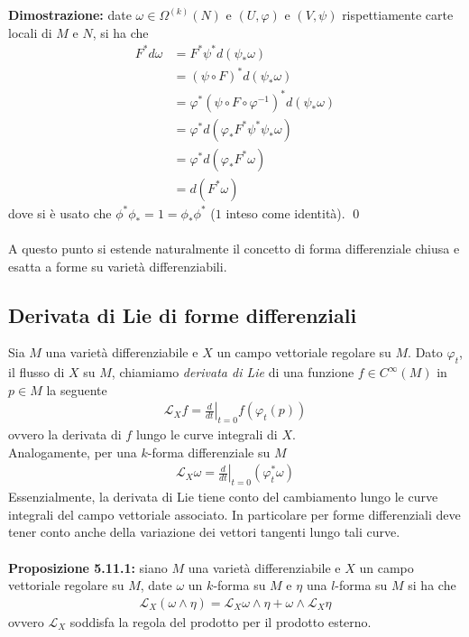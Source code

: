 \documentclass{article}
\begin{document}
\textbf{Dimostrazione:} date $\omega \in \Omega^{(k)}(N)$ e $(U, \varphi)$ e $(V, \psi)$ rispettiamente carte locali di $M$ e $N$, si ha che
\begin{align*}
    F^*d\omega &= F^*\psi^*d(\psi_*\omega) \\
    &= (\psi \circ F)^*d(\psi_*\omega) \\
    &= \varphi^*(\psi \circ F \circ \varphi^{-1})^*d(\psi_*\omega) \\
    &= \varphi^*d(\varphi_*F^*\psi^*\psi_*\omega) \\
    &= \varphi^*d(\varphi_*F^*\omega) \\
    &= d(F^*\omega) \tag{5.10.20}
\end{align*}
dove si è usato che $\phi^*\phi_* = 1 = \phi_*\phi^*$ ($1$ inteso come identità). \qed \\ \\
A questo punto si estende naturalmente il concetto di forma differenziale chiusa e esatta a forme su varietà differenziabili.

\newpage
\subsection{Derivata di Lie di forme differenziali}
Sia $M$ una varietà differenziabile e $X$ un campo vettoriale regolare su $M$. Dato $\varphi_t$, il flusso di $X$ su $M$, chiamiamo \textit{derivata di Lie} di una funzione $f \in C^\infty(M)$ in $p \in M$ la seguente
\begin{align*}
    \mathcal{L}_Xf = \left.\frac{d}{dt}\right|_{t = 0}f(\varphi_t(p)) \tag{5.11.1}
\end{align*}
ovvero la derivata di $f$ lungo le curve integrali di $X$. \\
Analogamente, per una $k$-forma differenziale su $M$
\begin{align*}
    \mathcal{L}_X\omega = \left.\frac{d}{dt}\right|_{t = 0}(\varphi^*_t\omega) \tag{5.11.2}
\end{align*}
Essenzialmente, la derivata di Lie tiene conto del cambiamento lungo le curve integrali del campo vettoriale associato. In particolare per forme differenziali deve tener conto anche della variazione dei vettori tangenti lungo tali curve. \\ \\
\textbf{Proposizione 5.11.1:} siano $M$ una varietà differenziabile e $X$ un campo vettoriale regolare su $M$, date $\omega$ un $k$-forma su $M$ e $\eta$ una $l$-forma su $M$ si ha che
\begin{align*}
    \mathcal{L}_X(\omega \wedge \eta) = \mathcal{L}_X\omega \wedge \eta + \omega \wedge \mathcal{L}_X\eta \tag{5.11.3}
\end{align*}
ovvero $\mathcal{L}_X$ soddisfa la regola del prodotto per il prodotto esterno. \\
\end{document}
